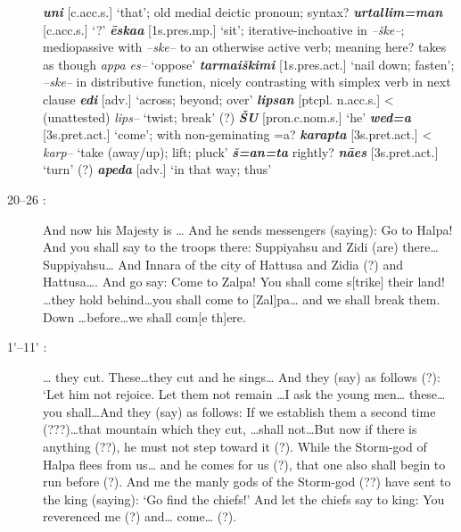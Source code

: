 \documentclass[10pt]{article}
\newcommand{\bit}[1]{\textbf{\textit{#1}}}				%
\newcommand{\p}[1]{{\tiny[{#1}]}}					%
\newcommand{\pr}{\'{ }}									%
\newcommand{\hith}{\textsubwedge{h}}
\renewcommand{\.}[1]{\textsubdot{#1}}
\begin{document}
\begin{description}
\begin{notes}
\bit{uni} \p{c.acc.s.} `that'; old medial deictic pronoun; syntax? \bit{{\hith}urtallim=man} \p{c.acc.s.} `?' \bit{\=eska{\hith}{\hith}a} \p{1s.pres.mp.} `sit'; iterative-inchoative in \textit{--\v{s}ke--}; mediopassive with \textit{--ske--} to an otherwise active verb; meaning here? \citet{soysal1981puhanu} takes as though \textit{appa es--} `oppose' \bit{tarmai\v{s}kimi} \p{1s.pres.act.} `nail down; fasten'; \textit{--ske--} in distributive function, nicely contrasting with simplex verb in next clause \bit{edi} \p{adv.} `across; beyond; over' \bit{lipsan} \p{ptcpl. n.acc.s.} < (unattested) \textit{lips--} `twist; break' (?) \bit{\v{S}U} \p{pron.c.nom.s.} `he' \bit{wed=a} \p{3s.pret.act.} `come'; with non-geminating =a? \bit{karapta} \p{3s.pret.act.} < \textit{karp--} `take (away/up); lift; pluck' \bit{\v{s}=an=ta} rightly? \bit{n\=aes} \p{3s.pret.act.} `turn' (?) \bit{apeda} \p{adv.} `in that way; thus'

\end{notes}

\item[20--26 :] And now his Majesty is {\ldots} And he sends messengers (saying): Go to Halpa! And you shall say to the troops there: Suppiyahsu and Zidi (are) there{\ldots}Suppiyahsu{\ldots} And Innara of the city of Hattusa and Zidia (?) and Hattusa{\ldots}. And go say: Come to Zalpa! You shall come s[trike] their land! {\ldots}they hold behind{\ldots}you shall come to [Zal]pa{\ldots} and we shall break them. Down {\ldots}before{\ldots}we shall com[e th]ere.

\begin{notes}

\bigskip

\bigskip

\end{notes}

\item[1{\pr}--11{\pr} :] {\ldots} they cut. These{\ldots}they cut and he sings{\ldots} And they (say) as follows (?): `Let him not rejoice. Let them not remain {\ldots}I ask the young men{\ldots} these{\ldots} you shall{\ldots}And they (say) as follows: If we establish them a second time (???){\ldots}that mountain which they cut, {\ldots}shall not{\ldots}But now if there is anything (??), he must not step toward it (?). While the Storm-god of Halpa flees from us{\ldots} and he comes for us (?), that one also shall begin to run before (?). And me the manly gods of the Storm-god (??) have sent to the king (saying): `Go find the chiefs!' And let the chiefs say to king: You reverenced me (?) and{\ldots} come{\ldots} (?).


\end{description}
\end{document}

